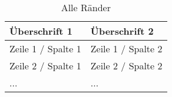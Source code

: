 \begin{table}[h]
\caption[Tabelle -- alle Ränder]{Alle Ränder}
\label{tab:Tabelle}
\centering 

\renewcommand{\arraystretch}{1.5} 
% 

\begin{tabularx}{\textwidth}{|R|R|}
\hline \hline 
\textbf{Überschrift 1}	& \textbf{Überschrift 2}				\\
\hline \hline
Zeile 1 / Spalte 1		& Zeile 1 / Spalte 2					\\
\hline
Zeile 2 / Spalte 1		& Zeile 2 / Spalte 2					\\
\hline
...						& ...									\\
\hline \hline
\end{tabularx}
\end{table}	
